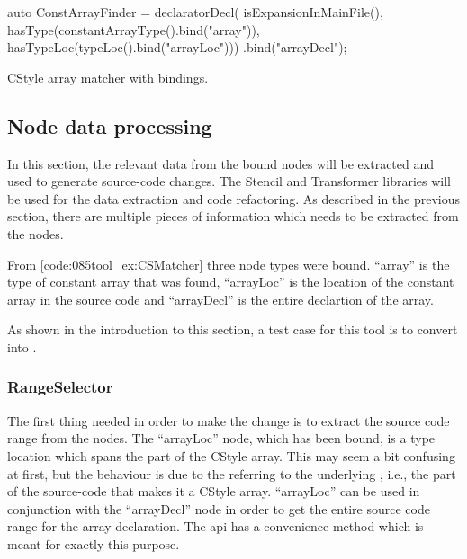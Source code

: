 \begin{listing}[H]
    \begin{cppcode}
auto ConstArrayFinder = 
    declaratorDecl(
        isExpansionInMainFile(),
        hasType(constantArrayType().bind("array")),
        hasTypeLoc(typeLoc().bind("arrayLoc")))
    .bind("arrayDecl");
    \end{cppcode}
    \caption{CStyle array matcher with bindings.}
    \label{code:085tool_ex:CSMatcher}
\end{listing}

\subsection{Node data processing}

In this section, the relevant data from the bound nodes will be extracted and used to generate source-code changes. The Stencil and Transformer libraries will be used for the data extraction and code refactoring.
As described in the previous section, there are multiple pieces of information which needs to be extracted from the nodes. 

From \cref{code:085tool_ex:CSMatcher} three node types were bound. ``array'' is the type of constant array that was found, ``arrayLoc'' is the location of the constant array in the source code and ``arrayDecl'' is the entire declartion of the array.

As shown in the introduction to this section, a test case for this tool is to convert  into .

\subsubsection*{RangeSelector}
The first thing needed in order to make the change is to extract the source code range from the nodes. The ``arrayLoc'' node, which has been bound, is a type location which spans the \cppinline{[2]} part of the CStyle array.
This may seem a bit confusing at first, but the behaviour is due to the  referring to the underlying , i.e., the part of the source-code that makes it a CStyle array.
``arrayLoc'' can be used in conjunction with the ``arrayDecl'' node in order to get the entire source code range for the array declaration. The  api has a convenience method  which is meant for exactly this purpose.

